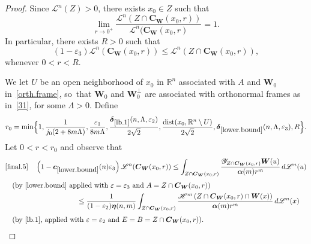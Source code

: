 \documentclass[JEP,XML,SOM,Unicode,ThmDefs,NoEqCountersInSection]{cedram}
\newcommand{\R}{\mathbb{R}}
\newcommand{\Rn}{\R^n}
\newcommand{\calH}{\mathscr{H}}
\newcommand{\calL}{\mathscr{L}}
\newcommand{\calY}{\mathscr{Y}}
\newcommand{\balpha}{\boldsymbol{\alpha}}
\newcommand{\bdelta}{\boldsymbol{\delta}}
\newcommand{\boldeta}{\boldsymbol{\eta}}
\newcommand{\bC}{{\boldsymbol{C}}}
\newcommand{\bW}{{\boldsymbol{W}}}
\newcommand{\bc}{{\boldsymbol{c}}}
\DeclareMathOperator{\rmdist}{\mathrm{dist}}\DeclareMathOperator{\rmHom}{\mathrm{Hom}}
\let\veps\varepsilon
\begin{document}
\begin{proof}
Since $\calL^n(Z) > 0$, there exists $x_0 \in Z$ such that
\begin{equation*}
\lim_{r \to 0^+} \frac{\calL^n (Z \cap \bC_\bW(x_0,r))}{\calL^n (\bC_\bW(x_0,r)} = 1.
\end{equation*}
In particular, there exists $R > 0$ such that
\begin{equation}
\label{final.4}
(1- \veps_3) \calL^n (\bC_\bW(x_0,r)) \leq \calL^n(Z \cap \bC_\bW(x_0,r)),
\end{equation}
whenever $0 < r < R$.
\par
We let $U$ be an open neighborhood of $x_0$ in $\Rn$ associated with $A$ and $\bW_0$ in~\ref{orth.frame}, so~that $\bW_0$ and $\bW_0^\perp$ are associated with orthonormal frames as in~\ref{31}, for some $\Lambda > 0$.
Define
\begin{equation*}
r_0 = \min \Bigl\{ 1, \frac{1}{j_0(2+8m\Lambda)}, \frac{\veps_1}{8m\Lambda}, \frac{\bdelta_{\ref{lb.1}}(n,\Lambda,\veps_2)}{2\sqrt{2}}, \frac{\rmdist(x_0,\Rn \setminus U)}{2\sqrt{2}}, \bdelta_{\ref{lower.bound}}(n,\Lambda,\veps_3), R \Bigr\}.
\end{equation*}
Let $0 < r < r_0$ and observe that\vspace*{-10pt}
\label{final.5}
\begin{multline*}
\eqref{final.5}\quad\left(1 - \bc_{\ref{lower.bound}}(n) \veps_3\right)  \calL^n (\bC_\bW(x_0,r)) \leq \int_{Z \cap \bC_\bW(x_0,r)} \frac{\calY_{Z \cap \bC_\bW(x_0,r)} \bW(u)}{\balpha(m)r^m} \,d\calL^n(u)\\[3pt]
\shoveleft{\text{(by \ref{lower.bound} applied with $\veps=\veps_3$ and $A=Z \cap \bC_\bW(x_0,r)$)}}\\
\shoveright{\leq \frac{1}{(1-\veps_2) \boldeta(n,m)} \int_{Z \cap \bC_\bW(x_0,r)} \frac{\calH^m \left(Z \cap \bC_\bW(x_0,r) \cap \bW(x) \right)}{\balpha(m)r^m} \,d\calL^n(x)}\\[3pt]
\shoveleft{\text{(by \ref{lb.1}, applied with $\veps=\veps_2$ and $E=B=Z\cap\bC_\bW(x_0,r)$).}}\hfill\mbox{}
\end{multline*}


\end{proof}
\end{document}
